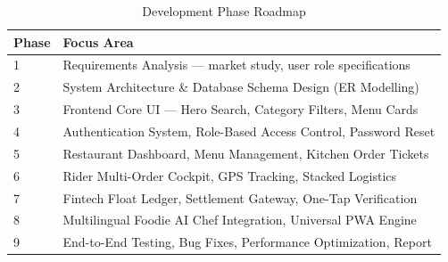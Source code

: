 \documentclass[12pt,a4paper]{report}
\begin{document}
\begin{table}[h!]
\centering
\caption{Development Phase Roadmap}
\label{tab:roadmap}
\begin{tabular}{|l|p{11cm}|}
\hline
\textbf{Phase} & \textbf{Focus Area} \\
\hline
1 & Requirements Analysis --- market study, user role specifications \\
\hline
2 & System Architecture \& Database Schema Design (ER Modelling) \\
\hline
3 & Frontend Core UI --- Hero Search, Category Filters, Menu Cards \\
\hline
4 & Authentication System, Role-Based Access Control, Password Reset \\
\hline
5 & Restaurant Dashboard, Menu Management, Kitchen Order Tickets \\
\hline
6 & Rider Multi-Order Cockpit, GPS Tracking, Stacked Logistics \\
\hline
7 & Fintech Float Ledger, Settlement Gateway, One-Tap Verification \\
\hline
8 & Multilingual Foodie AI Chef Integration, Universal PWA Engine \\
\hline
9 & End-to-End Testing, Bug Fixes, Performance Optimization, Report \\
\hline
\end{tabular}
\end{table}

\newpage
\end{document}
